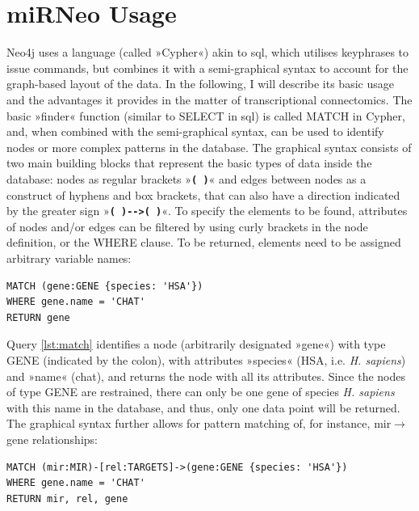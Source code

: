 
\section{miRNeo Usage} \label{sec:database:usage}
Neo4j uses a language (called »Cypher«) akin to \ac{sql}, which utilises keyphrases to issue commands, but combines it with a semi-graphical syntax to account for the graph-based layout of the data. In the following, I will describe its basic usage and the advantages it provides in the matter of transcriptional connectomics. The basic »finder« function (similar to \textcolor{dkblue}{SELECT} in \ac{sql}) is called \textcolor{dkblue}{MATCH} in Cypher, and, when combined with the semi-graphical syntax, can be used to identify nodes or more complex patterns in the database. The graphical syntax consists of two main building blocks that represent the basic types of data inside the database: nodes as regular brackets »\textbf{\texttt{( )}}« and edges between nodes as  a construct of hyphens and box brackets, that can also have a direction indicated by the greater sign \mbox{»\textbf{\texttt{( )-\string[ \string]->( )}}«}. To specify the elements to be found, attributes of nodes and/or edges can be filtered by using curly brackets in the node definition, or the \textcolor{dkblue}{WHERE} clause. To be returned, elements need to be assigned arbitrary variable names:

\begin{lstlisting}[label=lst:match, caption=MATCH, language=Cypher]
MATCH (gene:GENE {species: 'HSA'})
WHERE gene.name = 'CHAT'
RETURN gene
\end{lstlisting}

Query \ref{lst:match} identifies a node (arbitrarily designated »gene«) with type GENE (indicated by the colon), with attributes »species« (HSA, i.e. \textit{H. sapiens}) and »name« (\ac{chat}), and returns the node with all its attributes. Since the nodes of type GENE are restrained, there can only be one gene of species \textit{H. sapiens} with this name in the database, and thus, only one data point will be returned. The graphical syntax further allows for pattern matching of, for instance, \ac{mir}$\to$gene relationships:

\begin{lstlisting}[label=lst:pattern,caption=Patterns,
language=Cypher]
MATCH (mir:MIR)-[rel:TARGETS]->(gene:GENE {species: 'HSA'})
WHERE gene.name = 'CHAT'
RETURN mir, rel, gene
\end{lstlisting}

